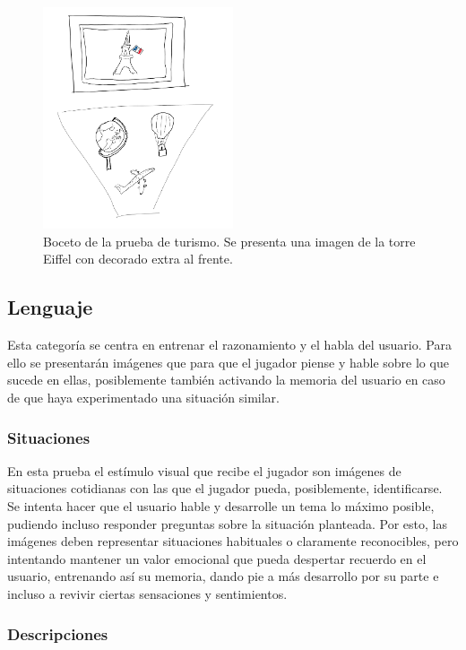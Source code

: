 \begin{figure}
  \centering
    \includegraphics[width=0.5\textwidth]{03.EstudioProblema/02.AnalisisInicial/00.Figuras/03.turismo.png}
    \caption{Boceto de la prueba de turismo. Se presenta una imagen de la torre Eiffel con decorado extra al frente.}
    \label{fig:AI_turismo}
\end{figure}


\subsection{Lenguaje}

Esta categoría se centra en entrenar el razonamiento y el habla del usuario. Para ello se presentarán imágenes que para que el jugador piense y hable sobre lo que sucede en ellas, posiblemente también activando la memoria del usuario en caso de que haya experimentado una situación similar.

\subsubsection{Situaciones}

En esta prueba el estímulo visual que recibe el jugador son imágenes de situaciones cotidianas con las que el jugador pueda, posiblemente, identificarse. Se intenta hacer que el usuario hable y desarrolle un tema lo máximo posible, pudiendo incluso responder preguntas sobre la situación planteada. Por esto, las imágenes deben representar situaciones habituales o claramente reconocibles, pero intentando mantener un valor emocional que pueda despertar recuerdo en el usuario, entrenando así su memoria, dando pie a más desarrollo por su parte e incluso a revivir ciertas sensaciones y sentimientos.


\subsubsection{Descripciones}

